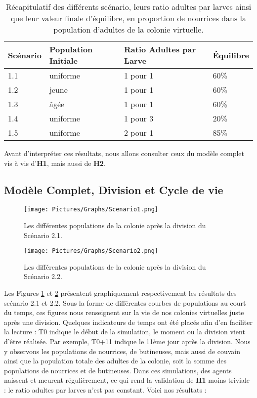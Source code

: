 	\begin{table}
		\centering
		\begin{tabular}{l|l|l|l}
    	Scénario & Population Initiale & Ratio Adultes par Larve & Équilibre \\
   		\hline
   		1.1 & uniforme & 1 pour 1 & 60\% \\
   		1.2 & jeune & 1 pour 1 & 60\% \\
   		1.3 & âgée & 1 pour 1 & 60\% \\
   		1.4 & uniforme & 1 pour 3 & 20\% \\
   		1.5 & uniforme & 2 pour 1 & 85\% \\
		\end{tabular}	
		\caption{Récapitulatif des différents scénario, leurs ratio adultes par larves ainsi que leur valeur finale d'équilibre, en proportion de nourrices dans la population d'adultes de la colonie virtuelle.}	
   		\label{TabEnvConstant}
	\end{table}	
	
	Avant d'interpréter ces résultats, nous allons consulter ceux du modèle complet vis à vis d'\textbf{H1}, mais aussi de \textbf{H2}.
	
	\subsection{Modèle Complet, Division et Cycle de vie}
	
	\begin{figure}
	\centering
	\texttt{[image: Pictures/Graphs/Scenario1.png]}
	\caption{Les différentes populations de la colonie après la division du Scénario 2.1.}
	\label{sc1}
	\end{figure}
	
	\begin{figure}
	\centering
	\texttt{[image: Pictures/Graphs/Scenario2.png]}
	\caption{Les différentes populations de la colonie après la division du Scénario 2.2.}
	\label{sc2}
	\end{figure}
	
	
	Les Figures \ref{sc1} et \ref{sc2} présentent graphiquement respectivement les résultats des scénario 2.1 et 2.2. Sous la forme de différentes courbes de populations au court du temps, ces figures nous renseignent sur la vie de nos colonies virtuelles juste après une division. Quelques indicateurs de temps ont été placés afin d'en faciliter la lecture : T0 indique le début de la simulation, le moment ou la division vient d'être réalisée. Par exemple, T0+11 indique le 11ème jour après la division. Nous y observons les populations de nourrices, de butineuses, mais aussi de couvain ainsi que la population totale des adultes de la colonie, soit la somme des populations de nourrices et de butineuses. Dans ces simulations, des agents naissent et meurent régulièrement, ce qui rend la validation de \textbf{H1} moins triviale : le ratio adultes par larves n'est pas constant. Voici nos résultats :
		
